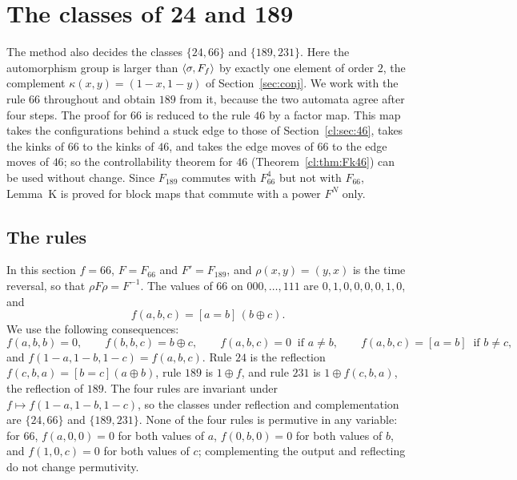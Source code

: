 \section{The classes of 24 and 189}\label{c24:sec}

The method also decides the classes $\{24,66\}$ and $\{189,231\}$. Here the automorphism group is larger than $\langle\sigma,F_f\rangle$ by exactly one element of order $2$, the complement $\kappa(x,y)=(1-x,1-y)$ of Section~\ref{sec:conj}. We work with the rule $66$ throughout and obtain $189$ from it, because the two automata agree after four steps. The proof for $66$ is reduced to the rule $46$ by a factor map. This map takes the configurations behind a stuck edge to those of Section~\ref{cl:sec:46}, takes the kinks of $66$ to the kinks of $46$, and takes the edge moves of $66$ to the edge moves of $46$; so the controllability theorem for $46$ (Theorem~\ref{cl:thm:Fk46}) can be used without change. Since $F_{189}$ commutes with $F_{66}^4$ but not with $F_{66}$, Lemma~K is proved for block maps that commute with a power $F^N$ only.

\subsection{The rules}\label{c24:sec:rules}

In this section $f=66$, $F=F_{66}$ and $F'=F_{189}$, and $\rho(x,y)=(y,x)$ is the time reversal, so that $\rho F\rho=F^{-1}$. The values of $66$ on $000,\dots,111$ are $0,1,0,0,0,0,1,0$, and
\[
f(a,b,c)=[a=b]\,(b\oplus c).
\]
We use the following consequences:
\begin{equation}\label{c24:eq:f}
f(a,b,b)=0,\qquad f(b,b,c)=b\oplus c,\qquad f(a,b,c)=0\ \text{ if }a\ne b,\qquad f(a,b,c)=[a=b]\ \text{ if }b\ne c,
\end{equation}
and $f(1-a,1-b,1-c)=f(a,b,c)$. Rule $24$ is the reflection $f(c,b,a)=[b=c](a\oplus b)$, rule $189$ is $1\oplus f$, and rule $231$ is $1\oplus f(c,b,a)$, the reflection of $189$. The four rules are invariant under $f\mapsto f(1-a,1-b,1-c)$, so the classes under reflection and complementation are $\{24,66\}$ and $\{189,231\}$. None of the four rules is permutive in any variable: for $66$, $f(a,0,0)=0$ for both values of $a$, $f(0,b,0)=0$ for both values of $b$, and $f(1,0,c)=0$ for both values of $c$; complementing the output and reflecting do not change permutivity.

